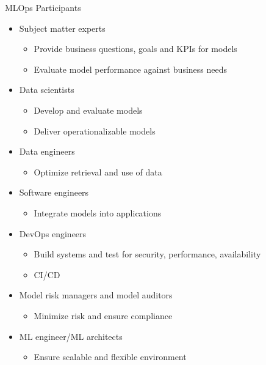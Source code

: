 \documentclass[ignorenonframetext,xcolor=x11names]{beamer}
\begin{document}
\begin{frame}{MLOps Participants}
\begin{itemize}
  \item Subject matter experts
  \begin{itemize}
  \footnotesize
     \item Provide business questions, goals and KPIs for models
     \item Evaluate model performance against business needs
  \end{itemize}
  \item Data scientists
  \begin{itemize}
  \footnotesize
     \item Develop and evaluate models
     \item Deliver operationalizable models
  \end{itemize}
  \item Data engineers
  \begin{itemize}
  \footnotesize
      \item Optimize retrieval and use of data
  \end{itemize}
  \item Software engineers
  \begin{itemize}
  \footnotesize
      \item Integrate models into applications
  \end{itemize}
  \item DevOps engineers
  \begin{itemize}
  \footnotesize
     \item Build systems and test for security, performance, availability
     \item CI/CD
  \end{itemize}
  \item Model risk managers and model auditors
  \begin{itemize}
  \footnotesize
      \item Minimize risk and ensure compliance
  \end{itemize}
  \item ML engineer/ML architects
  \begin{itemize}
  \footnotesize
     \item Ensure scalable and flexible environment
  \end{itemize}
\end{itemize}
\end{frame}
\end{document}
